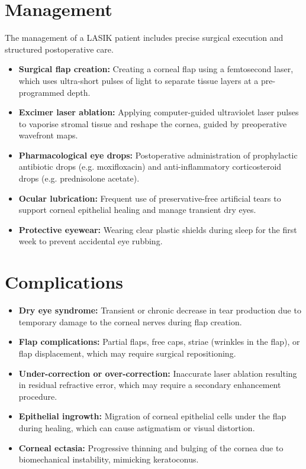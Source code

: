 \section*{Management}
The management of a LASIK patient includes precise surgical execution and structured postoperative care.
\begin{itemize}
    \item \textbf{Surgical flap creation:} Creating a corneal flap using a femtosecond laser, which uses ultra-short pulses of light to separate tissue layers at a pre-programmed depth.
    \item \textbf{Excimer laser ablation:} Applying computer-guided ultraviolet laser pulses to vaporise stromal tissue and reshape the cornea, guided by preoperative wavefront maps.
    \item \textbf{Pharmacological eye drops:} Postoperative administration of prophylactic antibiotic drops (e.g. moxifloxacin) and anti-inflammatory corticosteroid drops (e.g. prednisolone acetate).
    \item \textbf{Ocular lubrication:} Frequent use of preservative-free artificial tears to support corneal epithelial healing and manage transient dry eyes.
    \item \textbf{Protective eyewear:} Wearing clear plastic shields during sleep for the first week to prevent accidental eye rubbing.
\end{itemize}

\section*{Complications}
\begin{itemize}
    \item \textbf{Dry eye syndrome:} Transient or chronic decrease in tear production due to temporary damage to the corneal nerves during flap creation.
    \item \textbf{Flap complications:} Partial flaps, free caps, striae (wrinkles in the flap), or flap displacement, which may require surgical repositioning.
    \item \textbf{Under-correction or over-correction:} Inaccurate laser ablation resulting in residual refractive error, which may require a secondary enhancement procedure.
    \item \textbf{Epithelial ingrowth:} Migration of corneal epithelial cells under the flap during healing, which can cause astigmatism or visual distortion.
    \item \textbf{Corneal ectasia:} Progressive thinning and bulging of the cornea due to biomechanical instability, mimicking keratoconus.
\end{itemize}

